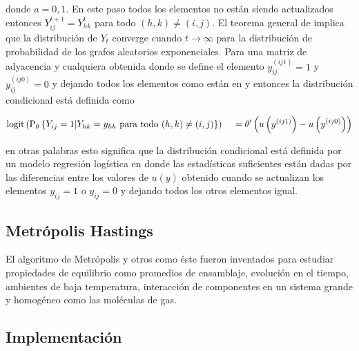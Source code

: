 donde $a=0,1$. En este paso todos los elementos no están siendo actualizados entonces $Y_{ij}^{t+1} = Y_{hk}^{t}$ para todo $(h,k) \neq (i,j)$. El teorema general de \cite{StochasticRelaxation} implica que la distribución de $Y_t$ converge cuando $t \to \infty$ para la distribución de probabilidad de los grafos aleatorios exponenciales. Para una matriz de adyacencia y cualquiera obtenida donde se define el elemento $y_{ij}^{(ij1)} = 1$ y $y_{ij}^{(ij0)} = 0$ y dejando todos los elementos como están en y entonces la distribución condicional está definida como

\begin{equation*}
    \operatorname{logit}\left(\mathrm{P}_{\theta}\left\{Y_{i j}=1 | Y_{h k}=y_{h k} \text { para todo }(h, k) \neq(i, j)\right\}\right) \\
    
\quad=\theta^{\prime}\left(u\left(y^{(i j 1)}\right)-u\left(y^{(i j 0)}\right)\right)
\end{equation*}

en otras palabras esto significa que la distribución condicional está definida por un modelo regresión logística en donde las estadísticas suficientes están dadas por las diferencias entre los valores de $u(y)$ obtenido cuando se actualizan los elementos $y_{ij} = 1$ o $y_{ij} = 0$ y dejando todos los otros elementos igual.


\subsection{Metrópolis Hastings}

El algoritmo de Metrópolis y otros como éste fueron inventados para estudiar propiedades de equilibrio como promedios de ensamblaje, evolución en el tiempo, ambientes de baja temperatura, interacción de componentes en un sistema grande y homogéneo como las moléculas de gas.


\subsection{Implementación}

